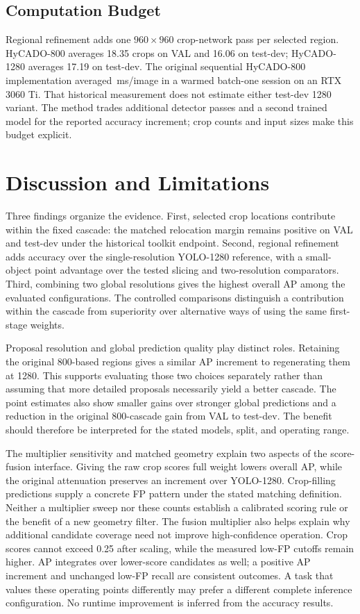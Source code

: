 \documentclass[journal]{IEEEtran}
\begin{document}
\subsection{Computation Budget}
Regional refinement adds one $960\times960$ crop-network pass per selected region. HyCADO-800 averages 18.35 crops on VAL and 16.06 on test-dev; HyCADO-1280 averages 17.19 on test-dev. The original sequential HyCADO-800 implementation averaged \HybridLatency\,ms/image in a warmed batch-one session on an RTX 3060 Ti. That historical measurement does not estimate either test-dev 1280 variant. The method trades additional detector passes and a second trained model for the reported accuracy increment; crop counts and input sizes make this budget explicit.

\section{Discussion and Limitations}
Three findings organize the evidence. First, selected crop locations contribute within the fixed cascade: the matched relocation margin remains positive on VAL and test-dev under the historical toolkit endpoint. Second, regional refinement adds accuracy over the single-resolution YOLO-1280 reference, with a small-object point advantage over the tested slicing and two-resolution comparators. Third, combining two global resolutions gives the highest overall AP among the evaluated configurations. The controlled comparisons distinguish a contribution within the cascade from superiority over alternative ways of using the same first-stage weights.

Proposal resolution and global prediction quality play distinct roles. Retaining the original 800-based regions gives a similar AP increment to regenerating them at 1280. This supports evaluating those two choices separately rather than assuming that more detailed proposals necessarily yield a better cascade. The point estimates also show smaller gains over stronger global predictions and a reduction in the original 800-cascade gain from VAL to test-dev. The benefit should therefore be interpreted for the stated models, split, and operating range.

The multiplier sensitivity and matched geometry explain two aspects of the score-fusion interface. Giving the raw crop scores full weight lowers overall AP, while the original attenuation preserves an increment over YOLO-1280. Crop-filling predictions supply a concrete FP pattern under the stated matching definition. Neither a multiplier sweep nor these counts establish a calibrated scoring rule or the benefit of a new geometry filter. The fusion multiplier also helps explain why additional candidate coverage need not improve high-confidence operation. Crop scores cannot exceed 0.25 after scaling, while the measured low-FP cutoffs remain higher. AP integrates over lower-score candidates as well; a positive AP increment and unchanged low-FP recall are consistent outcomes. A task that values these operating points differently may prefer a different complete inference configuration. No runtime improvement is inferred from the accuracy results.
\end{document}

